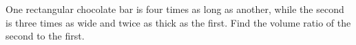 One rectangular chocolate bar is four times as long as another, while the second is three times as wide and twice as thick as the first. Find the volume ratio of the second to the first.
